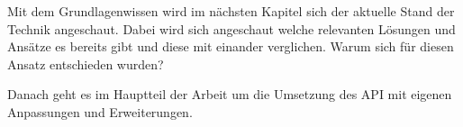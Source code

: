 Mit dem Grundlagenwissen wird im nächsten Kapitel sich der aktuelle Stand der Technik angeschaut.
Dabei wird sich angeschaut welche relevanten Lösungen und Ansätze es bereits gibt und diese mit einander verglichen.
Warum sich für diesen Ansatz entschieden wurden?

Danach geht es im Hauptteil der Arbeit um die Umsetzung des API mit eigenen Anpassungen und Erweiterungen.








